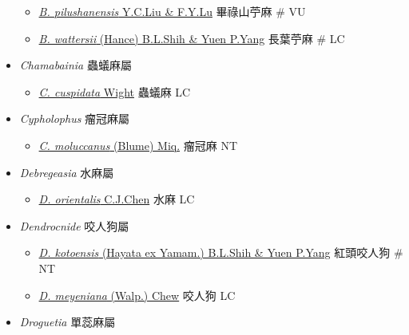 \begin{itemize}
\begin{itemize}
        \item[] \href{http://www.theplantlist.org/tpl1.1/search?q=Boehmeria+pilushanensis}{\textit{B. pilushanensis} Y.C.Liu \& F.Y.Lu}   畢祿山苧麻  \# VU
        \item[] \href{http://www.theplantlist.org/tpl1.1/search?q=Boehmeria+wattersii}{\textit{B. wattersii} (Hance) B.L.Shih \& Yuen P.Yang}   長葉苧麻  \# LC
  \end{itemize}
 \item[] \textit{Chamabainia} 蟲蟻麻屬
                                
  \begin{itemize}
        \item[] \href{http://www.theplantlist.org/tpl1.1/search?q=Chamabainia+cuspidata}{\textit{C. cuspidata} Wight}   蟲蟻麻   LC
  \end{itemize}
 \item[] \textit{Cypholophus} 瘤冠麻屬
                                
  \begin{itemize}
        \item[] \href{http://www.theplantlist.org/tpl1.1/search?q=Cypholophus+moluccanus}{\textit{C. moluccanus} (Blume) Miq.}   瘤冠麻   NT
  \end{itemize}
 \item[] \textit{Debregeasia} 水麻屬
                                
  \begin{itemize}
        \item[] \href{http://www.theplantlist.org/tpl1.1/search?q=Debregeasia+orientalis}{\textit{D. orientalis} C.J.Chen}   水麻   LC
  \end{itemize}
 \item[] \textit{Dendrocnide} 咬人狗屬
                                
  \begin{itemize}
        \item[] \href{http://www.theplantlist.org/tpl1.1/search?q=Dendrocnide+kotoensis}{\textit{D. kotoensis} (Hayata ex Yamam.) B.L.Shih \& Yuen P.Yang}   紅頭咬人狗  \# NT
        \item[] \href{http://www.theplantlist.org/tpl1.1/search?q=Dendrocnide+meyeniana}{\textit{D. meyeniana} (Walp.) Chew}   咬人狗   LC
  \end{itemize}
 \item[] \textit{Droguetia} 單蕊麻屬
                                

\end{itemize}
